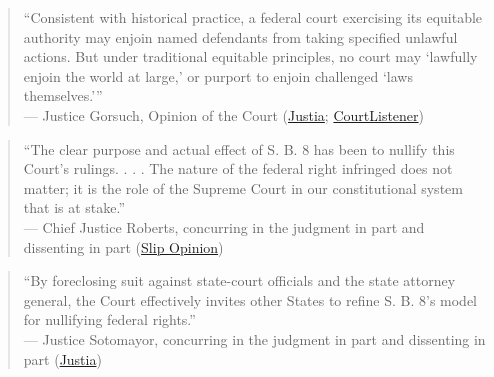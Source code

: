 \documentclass[12pt]{article}
\begin{document}
\begin{quote}
``Consistent with historical practice, a federal court exercising its equitable authority may enjoin named defendants from taking specified unlawful actions. But under traditional equitable principles, no court may `lawfully enjoin the world at large,' or purport to enjoin challenged `laws themselves.''' \\
--- Justice Gorsuch, Opinion of the Court (\href{https://supreme.justia.com/cases/federal/us/595/21-463/}{Justia}; \href{https://www.courtlistener.com/opinion/5305640/whole-womans-health-v-jackson/}{CourtListener})
\end{quote}

\begin{quote}
``The clear purpose and actual effect of S. B. 8 has been to nullify this Court's rulings. . . . The nature of the federal right infringed does not matter; it is the role of the Supreme Court in our constitutional system that is at stake.'' \\
--- Chief Justice Roberts, concurring in the judgment in part and dissenting in part (\href{https://www.supremecourt.gov/opinions/21pdf/21-463_3ebh.pdf}{Slip Opinion})
\end{quote}

\begin{quote}
``By foreclosing suit against state-court officials and the state attorney general, the Court effectively invites other States to refine S. B. 8's model for nullifying federal rights.'' \\
--- Justice Sotomayor, concurring in the judgment in part and dissenting in part (\href{https://supreme.justia.com/cases/federal/us/595/21-463/}{Justia})
\end{quote}
\end{document}
